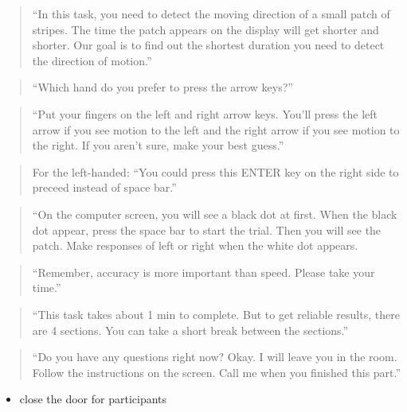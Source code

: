 \documentclass[]{article}
\providecommand{\tightlist}{%
  \setlength{\itemsep}{0pt}\setlength{\parskip}{0pt}}
\begin{document}
\begin{quote}
``In this task, you need to detect the moving direction of a small patch
of stripes. The time the patch appears on the display will get shorter
and shorter. Our goal is to find out the shortest duration you need to
detect the direction of motion.''
\end{quote}

\begin{quote}
``Which hand do you prefer to press the arrow keys?''
\end{quote}

\begin{quote}
``Put your fingers on the left and right arrow keys. You'll press the
left arrow if you see motion to the left and the right arrow if you see
motion to the right. If you aren't sure, make your best guess.''
\end{quote}

\begin{quote}
For the left-handed: ``You could press this ENTER key on the right side
to preceed instead of space bar.''
\end{quote}

\begin{quote}
``On the computer screen, you will see a black dot at first. When the
black dot appear, press the space bar to start the trial. Then you will
see the patch. Make responses of left or right when the white dot
appears.
\end{quote}

\begin{quote}
``Remember, accuracy is more important than speed. Please take your
time.''
\end{quote}

\begin{quote}
``This task takes about 1 min to complete. But to get reliable results,
there are 4 sections. You can take a short break between the sections.''
\end{quote}

\begin{quote}
``Do you have any questions right now? Okay. I will leave you in the
room. Follow the instructions on the screen. Call me when you finished
this part.''
\end{quote}

\begin{itemize}
\tightlist
\item
  close the door for participants
\end{itemize}
\end{document}
